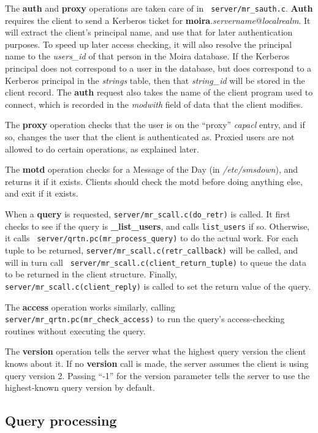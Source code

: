 The {\bf auth} and {\bf proxy} operations are taken care of in {\tt
server/mr\_sauth.c}. {\bf Auth} requires the client to send a Kerberos
ticket for {\bf moira}.{\it servername\/}@{\it localrealm}. It will
extract the client's principal name, and use that for later
authentication purposes. To speed up later access checking, it will
also resolve the principal name to the {\it users\_id} of that person
in the Moira database. If the Kerberos principal does not correspond
to a user in the database, but does correspond to a Kerberos principal
in the {\it strings\/} table, then that {\it string\_id\/} will be
stored in the client record. The {\bf auth} request also takes the
name of the client program used to connect, which is recorded in the
{\it modwith\/} field of data that the client modifies.

The {\bf proxy} operation checks that the user is on the ``proxy''
{\it capacl\/} entry, and if so, changes the user that the client is
authenticated as. Proxied users are not allowed to do certain
operations, as explained later.

The {\bf motd} operation checks for a Message of the Day (in {\it
/etc/smsdown\/}), and returns it if it exists. Clients should check
the motd before doing anything else, and exit if it exists.

When a {\bf query} is requested, {\tt server/mr\_scall.c(do\_retr)} is
called. It first checks to see if the query is {\bf \_list\_users},
and calls {\tt list\_users} if so. Otherwise, it calls {\tt
server/qrtn.pc(mr\_process\_query)} to do the actual work. For each
tuple to be returned, {\tt server/mr\_scall.c(retr\_callback)} will be
called, and will in turn call {\tt
server/mr\_scall.c(client\_return\_tuple)} to queue the data to be
returned in the client structure. Finally, {\tt
server/mr\_scall.c(client\_reply)} is called to set the return value
of the query.

The {\bf access} operation works similarly, calling {\tt
server/mr\_qrtn.pc(mr\_check\_access)} to run the query's
access-checking routines without executing the query.

The {\bf version} operation tells the server what the highest query
version the client knows about it. If no {\bf version} call is made,
the server assumes the client is using query version 2. Passing ``-1''
for the version parameter tells the server to use the highest-known
query version by default.

\subsection{Query processing}


